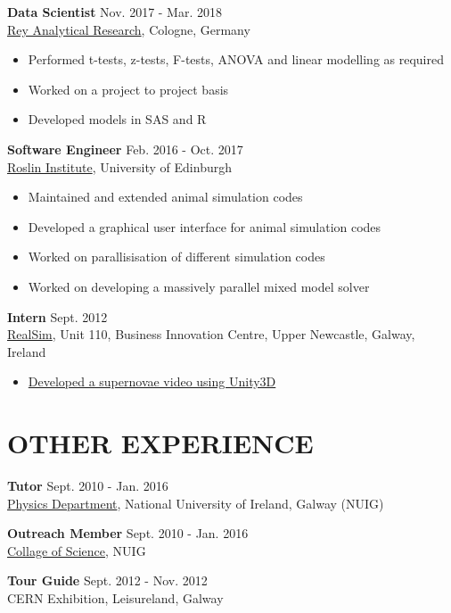 \documentclass[margin, 10pt]{res} %
\begin{document}
\begin{resume}
{\bf Data Scientist } \hfill Nov. 2017 - Mar. 2018 \\
\href{http://www.reyar.de}{Rey Analytical Research}, Cologne, Germany
\begin{itemize} \itemsep -2pt
\item Performed t-tests, z-tests, F-tests, ANOVA and linear modelling as required
\item Worked on a project to project basis
\item Developed models in SAS and R
\end{itemize}


{\bf Software Engineer} \hfill Feb. 2016 - Oct. 2017 \\
\href{http://www.alphagenes.roslin.ed.ac.uk/diarmaid-debruca/}{Roslin Institute}, University of Edinburgh
\begin{itemize} \itemsep -2pt
 \item Maintained and extended animal simulation codes
 \item Developed a graphical user interface for animal simulation codes
 \item Worked on parallisisation of different simulation codes
 \item Worked on developing a massively parallel mixed model solver
\end{itemize}

{\bf Intern }\hfill Sept. 2012\\
\href{http://www.realsim.ie/home}{RealSim}, Unit 110, Business Innovation Centre, Upper Newcastle, Galway, Ireland  
\begin{itemize} \itemsep -2pt
 \item \href{https://www.youtube.com/watch?v=MRwUUMN-JCU}{Developed a supernovae video using Unity3D} 
\end{itemize}

\section{OTHER EXPERIENCE}
{\bf Tutor} \hfill Sept. 2010 - Jan. 2016 \\
\href{http://www.nuigalway.ie/physics/}{Physics Department}, National University of Ireland, Galway (NUIG)

 
{\bf Outreach Member} \hfill Sept. 2010 - Jan. 2016 \\
\href{http://www.nuigalway.ie/science/}{Collage of Science}, NUIG


{\bf Tour Guide} \hfill Sept. 2012 - Nov. 2012 \\
CERN Exhibition, Leisureland, Galway





\end{resume}
\end{document}
